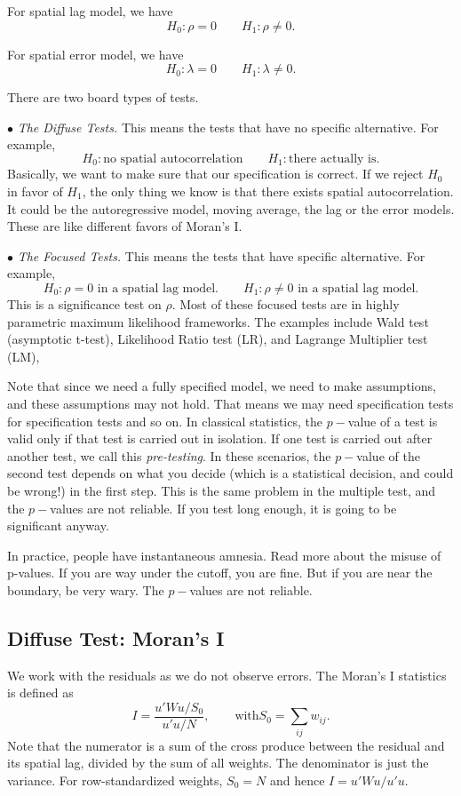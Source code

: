 \documentclass[11pt,a4paper]{amsart}
\theoremstyle{plain}
\theoremstyle{definition}
\begin{document}
For spatial lag model, we have 
\[	H_{0}: \rho = 0 \qquad H_{1}: \rho \ne 0.	\]

For spatial error model, we have 
\[	H_{0}: \lambda = 0 \qquad H_{1}: \lambda \ne 0.	\]

There are two board types of tests.

$\bullet$ \textit{The Diffuse Tests.} This means the tests that have no specific alternative. For example, 
\[	H_{0}: \text{no spatial autocorrelation} \qquad H_{1}: \text{there actually is}.	\]
Basically, we want  to make sure that our specification is correct. If we reject $H_{0}$ in favor of $H_{1}$, the only thing we know is that there exists spatial autocorrelation. It could be the autoregressive model, moving average, the lag or the error models. These are like different favors of Moran's I. 

$\bullet$ \textit{The Focused Tests.} This means the tests that have specific alternative. For example, 
\[	H_{0}: \text{$\rho = 0$ in a spatial lag model.} \qquad H_{1}: \text{$\rho \ne 0$ in a spatial lag model.}	\]
This is a significance test on $\rho$. Most of these focused tests are in highly parametric maximum likelihood frameworks. The examples include Wald test (asymptotic t-test), Likelihood Ratio test (LR), and Lagrange Multiplier test (LM), 

Note that since we need a fully specified model, we need to make assumptions, and these assumptions may not hold. That means we may need specification tests for specification tests and so on. In classical statistics, the $p-$value of a test is valid only if that test is carried out in isolation. If one test is carried out after another test, we call this \textit{pre-testing}. In these scenarios, the $p-$value of the second test depends on what you decide (which is a statistical decision, and could be wrong!) in the first step. This is the same problem in the multiple test, and the $p-$values are not reliable. If you test long enough, it is going to be significant anyway. 

In practice, people have instantaneous amnesia. Read more about the misuse of p-values. If you are way under the cutoff, you are fine. But if you are near the boundary, be very wary. The $p-$values are not reliable.

\subsection{Diffuse Test: Moran's I}\hfill\par 
We work with the residuals as we do not observe errors. The Moran's I statistics is defined as 
\[	I = \frac{u'Wu/S_{0}}{u'u/N}, \qquad \text{with} S_{0} = \sum_{ij} w_{ij}.	\]
Note that the numerator is a sum of the cross produce between the residual and its spatial lag, divided by the sum of all weights. The denominator is just the variance. For row-standardized weights, $S_{0} = N$ and hence $I = u'Wu/u'u$.
\end{document}
